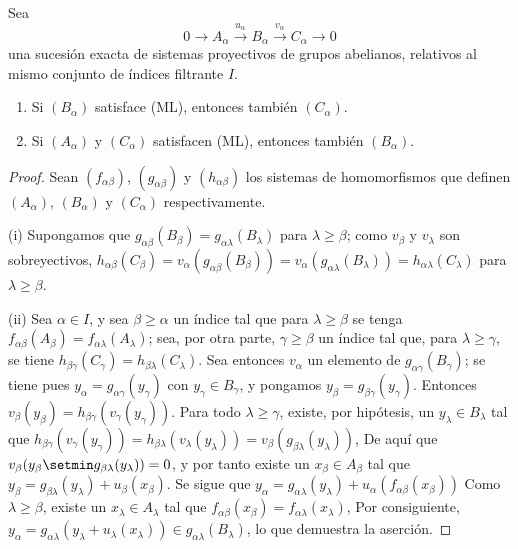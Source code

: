\begin{proposition}[13.2.1]
\label{0.13.2.1}
\label{0.13.2.1-fr}
Sea
\[
0\longrightarrow A_\alpha\xrightarrow{u_\alpha}B_\alpha
\xrightarrow{v_\alpha}C_\alpha\longrightarrow0
\]
una sucesión exacta de sistemas proyectivos de grupos abelianos, relativos
al mismo conjunto de índices filtrante $I$.
\begin{enumerate}
  \item[{\rm(i)}]
  Si $(B_\alpha)$ satisface {\rm(ML)}, entonces también $(C_\alpha)$.
  \item[{\rm(ii)}]
  Si $(A_\alpha)$ y $(C_\alpha)$ satisfacen {\rm(ML)}, entonces también
  $(B_\alpha)$.
\end{enumerate}
\end{proposition}

\begin{proof}
Sean $(f_{\alpha\beta})$, $(g_{\alpha\beta})$ y
$(h_{\alpha\beta})$ los sistemas de homomorfismos que definen
$(A_\alpha)$, $(B_\alpha)$ y $(C_\alpha)$ respectivamente.

(i) Supongamos que $g_{\alpha\beta}(B_\beta)=g_{\alpha\lambda}(B_\lambda)$ para $\lambda\geq\beta$; como $v_\beta$ y $v_\lambda$ son sobreyectivos,
$h_{\alpha\beta}(C_\beta)=v_\alpha(g_{\alpha\beta}(B_\beta))=v_\alpha(g_{\alpha\lambda}(B_\lambda))=h_{\alpha\lambda}(C_\lambda)$
para $\lambda\geq\beta$.

(ii) Sea $\alpha\in I$, y sea $\beta\geq\alpha$ un índice tal que para $\lambda\geq\beta$ se tenga $f_{\alpha\beta}(A_\beta)=f_{\alpha\lambda}(A_\lambda)$; sea, por otra parte, $\gamma\geq\beta$ un índice tal que, para $\lambda\geq\gamma$, se tiene
$h_{\beta\gamma}(C_\gamma)=h_{\beta\lambda}(C_\lambda)$. Sea entonces
$v_\alpha$ un elemento de $g_{\alpha\gamma}(B_\gamma)$; se tiene pues
$y_\alpha=g_{\alpha\gamma}(y_\gamma)$ con $y_\gamma\in B_\gamma$,
y pongamos $y_\beta=g_{\beta\gamma}(y_\gamma)$.
Entonces
$v_\beta(y_\beta)=h_{\beta\gamma}(v_\gamma(y_\gamma))$.
Para todo $\lambda\geq\gamma$, existe, por hipótesis, un
$y_\lambda\in B_\lambda$ tal que
$h_{\beta\gamma}(v_\gamma(y_\gamma))
=h_{\beta\lambda}(v_\lambda(y_\lambda))
=v_\beta(g_{\beta\lambda}(y_\lambda))$,
De aquí que
$v_\beta(y_\beta\setmin g_{\beta\lambda}(y_\lambda))=0$, y por tanto
existe un $x_\beta\in A_\beta$
tal que
$y_\beta=g_{\beta\lambda}(y_\lambda)+u_\beta(x_\beta)$.
Se sigue que
$y_\alpha=g_{\alpha\lambda}(y_\lambda)+u_\alpha(f_{\alpha\beta}(x_\beta))$
Como $\lambda\geq\beta$, existe un $x_\lambda\in A_\lambda$ tal
que
$f_{\alpha\beta}(x_\beta)=f_{\alpha\lambda}(x_\lambda)$,
Por consiguiente,
$y_\alpha=g_{\alpha\lambda}(y_\lambda+u_\lambda(x_\lambda))\in g_{\alpha\lambda}(B_\lambda)$,
lo que demuestra la aserción.
\end{proof}

